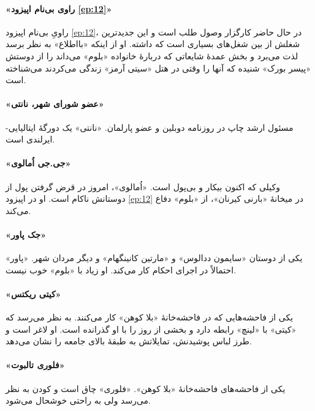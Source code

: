 \documentclass[12pt]{book}
\newcommand{\noun}[1]{«{#1}»}
\begin{document}
    \paragraph{\noun{راوی بی‌نام اپیزود \ref{ep:12}}}
    راویِ بی‌نام اپیزود \ref{ep:12}، در حال حاضر کارگزار وصول طلب است و این جدیدترین شغلش از بین شغل‌های بسیاری است که داشته. او از اینکه «بااطلاع» به نظر برسد لذت می‌برد و بخش عمدۀ شایعاتی که دربارۀ خانواده \noun{بلوم} می‌داند را از دوستش \noun{پیسر بورک} شنیده که آنها را وقتی در هتل \noun{سیتی آرمز} زندگی می‌کردند می‌شناخته است.
    \paragraph{\noun{عضو شورای شهر، نانتی}\protect{}}
    مسئول ارشد چاپ در روزنامه دوبلین و عضو پارلمان. \noun{نانتی} یک دورگۀ ایتالیایی-ایرلندی است.
    \paragraph{\noun{جی.جی اُمالوی}\protect{}}
    وکیلی که اکنون بیکار و بی‌پول است. \noun{اُمالوی}، امروز در قرض گرفتن پول از دوستانش ناکام است. او در اپیزود \ref{ep:12} در میخانۀ \noun{بارنی کیرنان}، از \noun{بلوم} دفاع می‌کند.
    \paragraph{\noun{جک پاور}\protect{}}
    یکی از دوستان \noun{سایمون ددالوس‬} و \noun{مارتین کانینگهام}  و دیگر مردان شهر. \noun{پاور} احتمالاً در اجرای احکام کار می‌کند. او زیاد با \noun{بلوم} خوب نیست.
    \paragraph{\noun{کیتی ریکتس}\protect{}}
    یکی از فاحشه‌هایی که در فاحشه‌خانۀ \noun{بلا کوهن} کار می‌کنند. به نظر می‌رسد که \noun{کیتی} با \noun{لینچ} رابطه دارد و بخشی از روز را با او گذرانده است. او لاغر است و طرز لباس پوشیدنش، تمایلاتش به طبقۀ بالای جامعه را نشان می‌دهد.
    \paragraph{\noun{فلوری تالبوت}\protect{}}
    یکی از فاحشه‌های فاحشه‌خانۀ \noun{بلا کوهن}. \noun{فلوری} چاق است و کودن به نظر می‌رسد ولی به راحتی خوشحال می‌شود.
\end{document}
